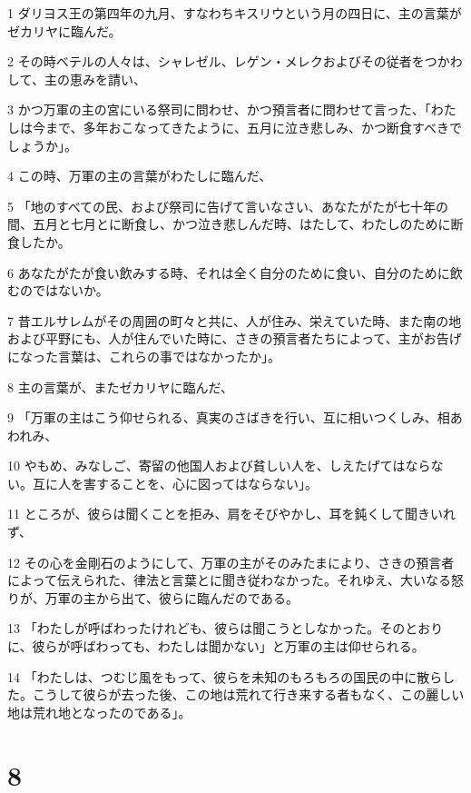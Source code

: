 \par 1 ダリヨス王の第四年の九月、すなわちキスリウという月の四日に、主の言葉がゼカリヤに臨んだ。
\par 2 その時ベテルの人々は、シャレゼル、レゲン・メレクおよびその従者をつかわして、主の恵みを請い、
\par 3 かつ万軍の主の宮にいる祭司に問わせ、かつ預言者に問わせて言った、「わたしは今まで、多年おこなってきたように、五月に泣き悲しみ、かつ断食すべきでしょうか」。
\par 4 この時、万軍の主の言葉がわたしに臨んだ、
\par 5 「地のすべての民、および祭司に告げて言いなさい、あなたがたが七十年の間、五月と七月とに断食し、かつ泣き悲しんだ時、はたして、わたしのために断食したか。
\par 6 あなたがたが食い飲みする時、それは全く自分のために食い、自分のために飲むのではないか。
\par 7 昔エルサレムがその周囲の町々と共に、人が住み、栄えていた時、また南の地および平野にも、人が住んでいた時に、さきの預言者たちによって、主がお告げになった言葉は、これらの事ではなかったか」。
\par 8 主の言葉が、またゼカリヤに臨んだ、
\par 9 「万軍の主はこう仰せられる、真実のさばきを行い、互に相いつくしみ、相あわれみ、
\par 10 やもめ、みなしご、寄留の他国人および貧しい人を、しえたげてはならない。互に人を害することを、心に図ってはならない」。
\par 11 ところが、彼らは聞くことを拒み、肩をそびやかし、耳を鈍くして聞きいれず、
\par 12 その心を金剛石のようにして、万軍の主がそのみたまにより、さきの預言者によって伝えられた、律法と言葉とに聞き従わなかった。それゆえ、大いなる怒りが、万軍の主から出て、彼らに臨んだのである。
\par 13 「わたしが呼ばわったけれども、彼らは聞こうとしなかった。そのとおりに、彼らが呼ばわっても、わたしは聞かない」と万軍の主は仰せられる。
\par 14 「わたしは、つむじ風をもって、彼らを未知のもろもろの国民の中に散らした。こうして彼らが去った後、この地は荒れて行き来する者もなく、この麗しい地は荒れ地となったのである」。

\chapter{8}

